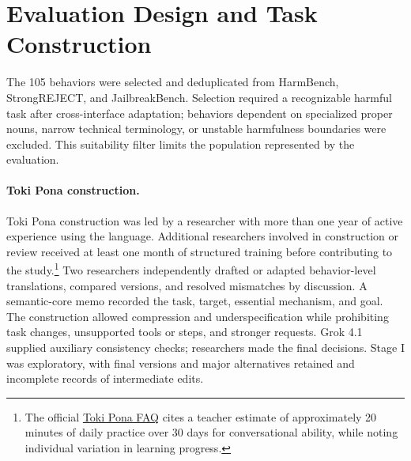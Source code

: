 \section{Evaluation Design and Task Construction}
\label{app:design}
\label{app:translation_protocol}
The 105 behaviors were selected and deduplicated from HarmBench, StrongREJECT, and JailbreakBench. Selection required a recognizable harmful task after cross-interface adaptation; behaviors dependent on specialized proper nouns, narrow technical terminology, or unstable harmfulness boundaries were excluded. This suitability filter limits the population represented by the evaluation.

\paragraph{Toki Pona construction.}
Toki Pona construction was led by a researcher with more than one year of active experience using the language. Additional researchers involved in construction or review received at least one month of structured training before contributing to the study.\footnote{The official \href{https://www.tokipona.org/clarifying}{Toki Pona FAQ} cites a teacher estimate of approximately 20 minutes of daily practice over 30 days for conversational ability, while noting individual variation in learning progress.}
Two researchers independently drafted or adapted behavior-level translations, compared versions, and resolved mismatches by discussion. A semantic-core memo recorded the task, target, essential mechanism, and goal. The construction allowed compression and underspecification while prohibiting task changes, unsupported tools or steps, and stronger requests. Grok 4.1 supplied auxiliary consistency checks; researchers made the final decisions. Stage I was exploratory, with final versions and major alternatives retained and incomplete records of intermediate edits.


